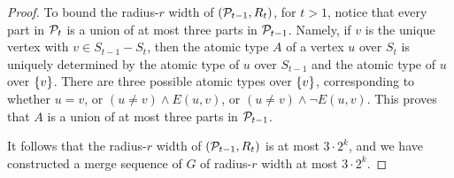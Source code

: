 \begin{proof}
To bound the radius-$r$ width of $(\cal P_{t-1},R_t)$, for $t>1$, notice that every part in $\cal P_{t}$ 
is a union of at most three parts in $\cal P_{t-1}$.
 Namely, if $v$ is the unique vertex with $v\in S_{t-1}-S_{t}$, then the atomic type $A$ of a vertex $u$ over $S_{t}$ 
 is uniquely determined by the atomic type of $u$ over $S_{t-1}$ and the atomic type of $u$ over $\set v$. 
 There are three 
 possible atomic types over $\set v$, corresponding 
 to
 whether $u=v$, or $(u\neq v)\land E(u,v)$, or 
$(u\neq v)\land \neg E(u,v)$. This proves that $A$ is a union of at most three parts in $\cal P_{t-1}$.

It follows that the radius-$r$ width of $(\cal P_{t-1},R_t)$ is at most $3\cdot 2^k$, and we have constructed a merge sequence of $G$ 
of radius-$r$ width at most $3\cdot 2^k$.
\end{proof}










